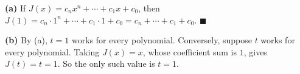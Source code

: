 \textbf{(a)} If $J(x)=c_nx^n+\cdots+c_1x+c_0$, then $J(1)=c_n\cdot1^n+\cdots+c_1\cdot1+c_0=c_n+\cdots+c_1+c_0$. $\blacksquare$

\textbf{(b)} By (a), $t=1$ works for every polynomial. Conversely, suppose $t$ works for every polynomial. Taking $J(x)=x$, whose coefficient sum is $1$, gives $J(t)=t=1$. So the only such value is $\boxed{t=1}$.
